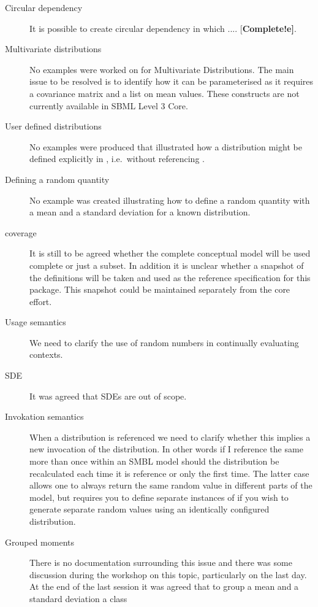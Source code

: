 \documentclass[draftspec]{sbmlpkgspec}
\begin{document}
\begin{description}
\item[Circular dependency] It is possible to create circular
  dependency in which .... [\textbf{Complete!e]}.
\item[Multivariate distributions] No examples were worked on for
  Multivariate Distributions. The main issue to be resolved is to
  identify how it can be parameterised as it requires a covariance matrix
  and a list on mean values. These constructs are not currently
  available in SBML Level 3 Core.
\item[User defined distributions] No examples were produced that
  illustrated how a distribution might be defined explicitly in
  \mathml, i.e.\ without referencing \uncertml.
\item[Defining a random quantity] No example was created illustrating
  how to define a random quantity with a mean and a standard deviation
  for a known distribution.
\item[\uncertml coverage] It is still to be agreed whether the
  complete \uncertml conceptual model will be used complete or just a
  subset. In addition it is unclear whether a snapshot of the
  \uncertml definitions will be taken and used as the reference
  specification for this package. This snapshot \contraversial could be
  maintained separately from the \uncertml core effort.
\item[Usage semantics] We need to clarify the use of random numbers
  in continually evaluating contexts.
\item[SDE] It was agreed that SDEs are out of scope.
\item[Invokation semantics] When a distribution is referenced we need
  to clarify whether this implies a new invocation of the
  distribution. In other words if I reference the same \Distribution
  more than once within an SMBL model should the distribution be
  recalculated each time it is reference or only the first time. The
  latter case allows one to always return the same random value in
  different parts of the model, but requires you to define separate
  instances of \Distribution if you wish to generate separate random
  values using an identically configured distribution.
\label{item:refsemantics}
\item[Grouped moments] There is no documentation surrounding this
  issue and there was some discussion during the workshop on this
  topic, particularly on the last day. At the end of the last session
  it was agreed that to group a mean and a standard deviation a class

\end{description}
\end{document}
